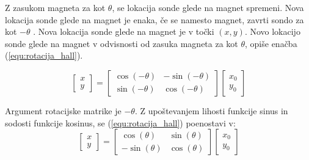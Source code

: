 Z zasukom magneta za kot $\theta$, se lokacija sonde glede na magnet spremeni. Nova lokacija sonde glede na magnet je enaka, če se namesto magnet, zavrti sondo za kot $-\theta$ . Nova lokacija sonde glede na magnet je v točki  $(x, y)$. Novo lokacijo sonde glede na magnet v odvisnosti od zasuka magneta za kot $\theta$, opiše enačba (\ref{equ:rotacija_hall}).

\begin{equation}
\label{equ:rotacija_hall}
\begin{bmatrix} x\\y \end{bmatrix}=
\begin{bmatrix} \cos(-\theta)&-\sin(-\theta)\\\sin(-\theta)&\cos(-\theta) \end{bmatrix}
\begin{bmatrix} x_0\\y_0 \end{bmatrix}
\end{equation}

Argument rotacijske matrike je $-\theta$. Z upoštevanjem lihosti funkcije sinus in sodosti funkcije kosinus\cite{Matematika1}, se (\ref{equ:rotacija_hall}) poenostavi v:
\begin{equation}
\begin{bmatrix} x\\y \end{bmatrix}=
\begin{bmatrix} \cos(\theta)&\sin(\theta)\\-\sin(\theta)&\cos(\theta) \end{bmatrix}
\begin{bmatrix} x_0\\y_0 \end{bmatrix}
\end{equation}

